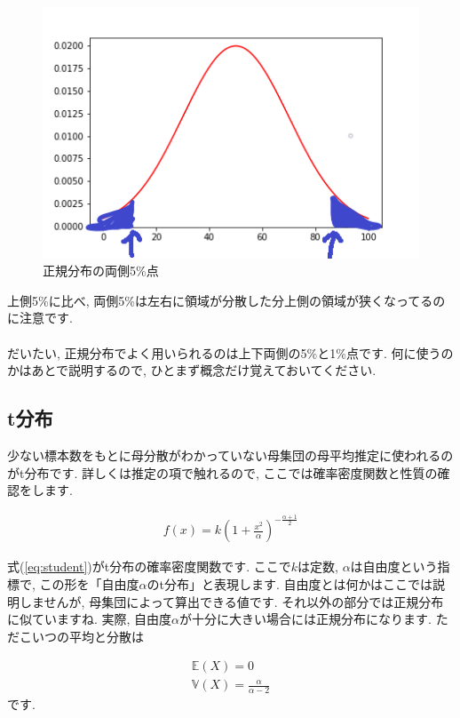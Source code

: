 \documentclass[11pt,a4paper]{jsarticle}                    %
\begin{document}
\begin{figure}[H]
\label{im:bilateral}
  \centering
  \includegraphics[width=120mm,bb=0 0 432 288]{../figures/bilateral_p.png}
  \caption{正規分布の両側5\%点}
\end{figure}

上側5\%に比べ, 両側5\%は左右に領域が分散した分上側の領域が狭くなってるのに注意です. \\
\\
だいたい, 正規分布でよく用いられるのは上下両側の5\%と1\%点です. 何に使うのかはあとで説明するので, ひとまず概念だけ覚えておいてください.

\subsection{t分布}
少ない標本数をもとに母分散がわかっていない母集団の母平均推定に使われるのがt分布です. 詳しくは推定の項で触れるので, ここでは確率密度関数と性質の確認をします.

\begin{eqnarray}
\label{eq:student}
f(x) = k(1 + \frac{x^2}{\alpha})^{-\frac{\alpha+1}{2}}
\end{eqnarray}

式(\ref{eq:student})がt分布の確率密度関数です. ここで$k$は定数, $\alpha$は自由度という指標で, この形を「自由度$\alpha$のt分布」と表現します. 自由度とは何かはここでは説明しませんが, 母集団によって算出できる値です. それ以外の部分では正規分布に似ていますね. 実際, 自由度$\alpha$が十分に大きい場合には正規分布になります. ただこいつの平均と分散は

\begin{eqnarray}
\mathbb{E}(X) = 0\\
\mathbb{V}(X) = \frac{\alpha}{\alpha-2}
\end{eqnarray}
です. 
\end{document}
